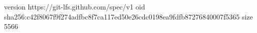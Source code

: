 version https://git-lfs.github.com/spec/v1
oid sha256:c42f8067f9f274adfbc8f7ca117ed50e26cdc0198ea9fdfb87276840007f5365
size 5566
